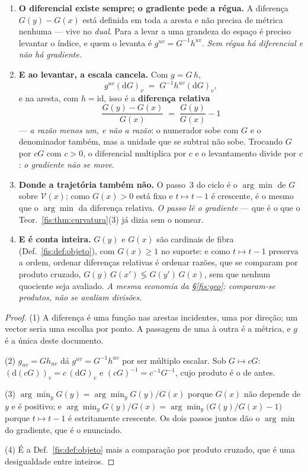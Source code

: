 \documentclass[livro.tex]{subfiles}
\begin{document}
\begin{teorema}\label{fis:thm:gradiente}
\begin{enumerate}\itemsep3pt
\item[(1)] \textbf{O diferencial existe sempre; o gradiente pede a régua.} A
diferença $G(y)-G(x)$ está definida em toda a aresta e não precisa de métrica
nenhuma --- vive no \emph{dual}. Para a levar a uma grandeza do espaço é preciso
levantar o índice, e quem o levanta é $g^{uv}=G^{-1}h^{uv}$. \emph{Sem régua há
diferencial e não há gradiente.}
\item[(2)] \textbf{E ao levantar, a escala cancela.} Com $g=G\,h$,
\[
g^{uv}(\mathrm{d}G)_v \;=\; G^{-1}h^{uv}(\mathrm{d}G)_v ,
\]
e na aresta, com $h=\mathrm{id}$, isso é a \textbf{diferença relativa}
\[
\frac{G(y)-G(x)}{G(x)}\;=\;\frac{G(y)}{G(x)}-1
\]
--- \emph{a razão menos um, e não a razão}: o numerador sobe com $G$ e o
denominador também, mas a unidade que se subtrai não sobe. Trocando $G$ por $cG$
com $c>0$, o diferencial multiplica por $c$ e o levantamento divide por $c$:
\emph{o gradiente não se move}.
\item[(3)] \textbf{Donde a trajetória também não.} O passo~3 do ciclo é o
$\arg\min$ de $G$ sobre $\mathcal{V}(x)$; como $G(x)>0$ está fixo e
$t\mapsto t-1$ é crescente, é o mesmo que o $\arg\min$ da diferença relativa.
\emph{O passo lê o gradiente} ---
que é o que o Teor.~\ref{fis:thm:curvatura}(3) já dizia sem o nomear.
\item[(4)] \textbf{E é conta inteira.} $G(y)$ e $G(x)$ são cardinais de fibra
(Def.~\ref{fis:def:objeto}), com $G(x)\ge1$ no suporte: e como $t\mapsto t-1$
preserva a ordem, ordenar diferenças relativas é ordenar razões, que se comparam
por produto cruzado, $G(y)\,G(x')\lessgtr G(y')\,G(x)$, sem que nenhum quociente
seja avaliado. \emph{A mesma economia da §\ref{fis:geo}: comparam-se produtos, não se
avaliam divisões.}
\end{enumerate}
\end{teorema}

\begin{proof}
(1) A diferença é uma função nas arestas incidentes, uma por direção; um vector
seria uma escolha por ponto. A passagem de uma à outra é a métrica, e $g$ é a
única deste documento.

(2) $g_{uv}=G h_{uv}$ dá $g^{uv}=G^{-1}h^{uv}$ por ser múltiplo escalar. Sob
$G\mapsto cG$: $(\mathrm{d}(cG))_v=c\,(\mathrm{d}G)_v$ e $(cG)^{-1}=c^{-1}G^{-1}$,
cujo produto é o de antes.

(3) $\arg\min_y G(y)=\arg\min_y G(y)/G(x)$ porque $G(x)$ não depende de $y$ e é
positivo; e $\arg\min_y G(y)/G(x)=\arg\min_y\bigl(G(y)/G(x)-1\bigr)$ porque
$t\mapsto t-1$ é estritamente crescente. Os dois passos juntos dão o $\arg\min$
do gradiente, que é o enunciado.

(4) É a Def.~\ref{fis:def:objeto} mais a comparação por produto cruzado, que é
uma desigualdade entre inteiros.
\end{proof}
\end{document}
